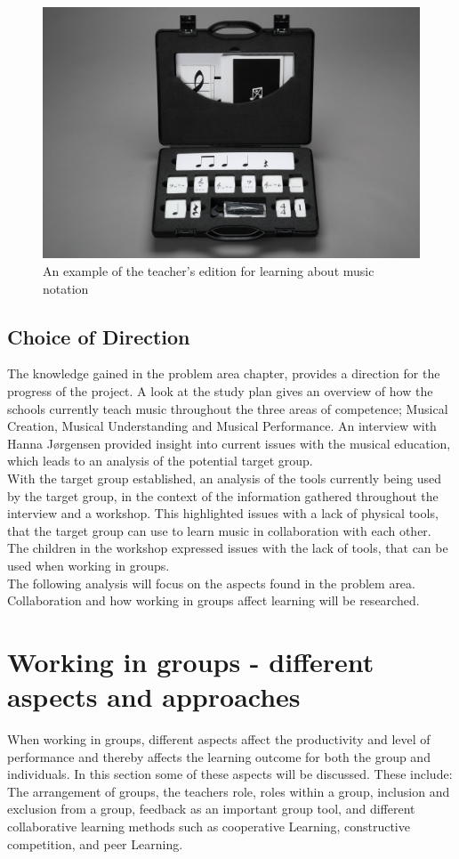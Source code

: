 \begin{figure}[H]
	\centering
	\includegraphics[width=0.7\linewidth]{figure/Analysis/musicworkout}
	\caption{An example of the teacher's edition for learning about music notation}
	\label{fig:musicworkout}
\end{figure}

\subsection{Choice of Direction}
The knowledge gained in the problem area chapter, provides a direction for the progress of the project. A look at the study plan gives an overview of how the schools currently teach music throughout the three areas of competence; Musical Creation, Musical Understanding and Musical Performance. An interview with Hanna Jørgensen provided insight into current issues with the musical education, which leads to an analysis of the potential target group.\\

With the target group established, an analysis of the tools currently being used by the target group, in the context of the information gathered throughout the interview and a workshop. This highlighted issues with a lack of physical tools, that the target group can use to learn music in collaboration with each other. The children in the workshop expressed issues with the lack of tools, that can be used when working in groups.\\

The following analysis will focus on the aspects found in the problem area. Collaboration and how working in groups affect learning will be researched.\\

\section{Working in groups - different aspects and approaches} %
When working in groups, different aspects affect the productivity and level of performance and thereby affects the learning outcome for both the group and individuals\cite{GodKlassekultur}. In this section some of these aspects will be discussed. These include: The arrangement of groups, the teachers role, roles within a group, inclusion and exclusion from a group, feedback as an important group tool, and different collaborative learning methods such as cooperative Learning, constructive competition, and peer Learning.

